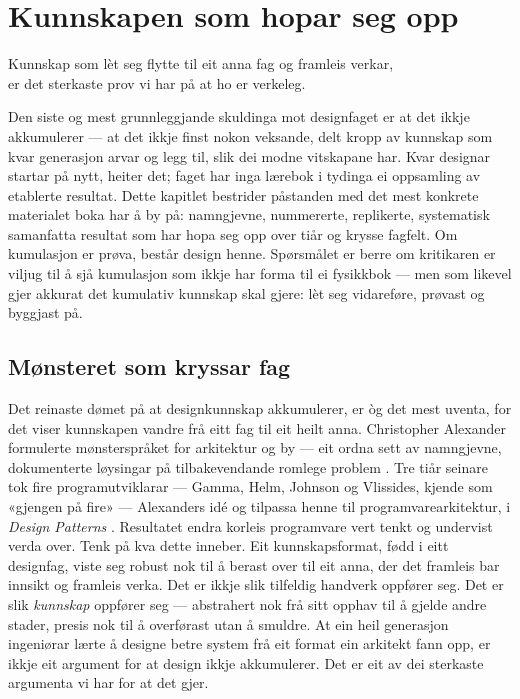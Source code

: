 \chapter{Kunnskapen som hopar seg opp}

\begin{motto}
Kunnskap som lèt seg flytte til eit anna fag og framleis verkar,\\ er det sterkaste prov vi har på at ho er verkeleg.
\end{motto}

Den siste og mest grunnleggjande skuldinga mot designfaget er at det ikkje akkumulerer — at det ikkje finst nokon veksande, delt kropp av kunnskap som kvar generasjon arvar og legg til, slik dei modne vitskapane har. Kvar designar startar på nytt, heiter det; faget har inga lærebok i tydinga ei oppsamling av etablerte resultat. Dette kapitlet bestrider påstanden med det mest konkrete materialet boka har å by på: namngjevne, nummererte, replikerte, systematisk samanfatta resultat som har hopa seg opp over tiår og krysse fagfelt. Om kumulasjon er prøva, består design henne. Spørsmålet er berre om kritikaren er viljug til å sjå kumulasjon som ikkje har forma til ei fysikkbok — men som likevel gjer akkurat det kumulativ kunnskap skal gjere: lèt seg vidareføre, prøvast og byggjast på.

\section{Mønsteret som kryssar fag}

Det reinaste dømet på at designkunnskap akkumulerer, er òg det mest uventa, for det viser kunnskapen vandre frå eitt fag til eit heilt anna. Christopher Alexander formulerte mønsterspråket for arkitektur og by — eit ordna sett av namngjevne, dokumenterte løysingar på tilbakevendande romlege problem \autocite{alexander1977pattern}. Tre tiår seinare tok fire programutviklarar — Gamma, Helm, Johnson og Vlissides, kjende som «gjengen på fire» — Alexanders idé og tilpassa henne til programvarearkitektur, i \textit{Design Patterns} \autocite{gof1994patterns}. Resultatet endra korleis programvare vert tenkt og undervist verda over. Tenk på kva dette inneber. Eit kunnskapsformat, fødd i eitt designfag, viste seg robust nok til å berast over til eit anna, der det framleis bar innsikt og framleis verka. Det er ikkje slik tilfeldig handverk oppfører seg. Det er slik \emph{kunnskap} oppfører seg — abstrahert nok frå sitt opphav til å gjelde andre stader, presis nok til å overførast utan å smuldre. At ein heil generasjon ingeniørar lærte å designe betre system frå eit format ein arkitekt fann opp, er ikkje eit argument for at design ikkje akkumulerer. Det er eit av dei sterkaste argumenta vi har for at det gjer.

